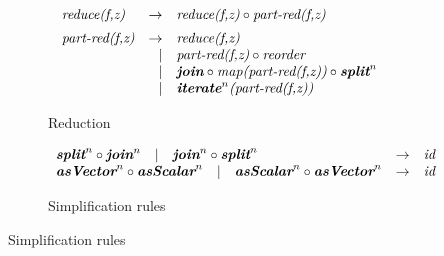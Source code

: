 \begin{figure}[t]
\vspace{\ruleSpace}
\begin{subfigure}[b]{1\linewidth}
\begin{mdframed}
$$
\begin{array}{lrl}
\pat{reduce(f,z)} & \rightarrow & \pat{reduce(f,z)} \circ \pat{part-red(f,z)}\\[.5em]
\pat{part-red(f,z)} & \rightarrow & \pat{reduce(f,z)}\\                                                      
  &| & \pat{part-red(f,z)} \circ \pat{reorder}\\    
  &| & \pat{\textbf{join}} \circ \pat{map(part-red(f,z))} \circ \pat{\textbf{split}}^n\\
  &| & \pat{\textbf{iterate}}^{n}\pat{(part-red(f,z))}\\
\end{array}
%
$$
\end{mdframed}
  \caption{Reduction}
  \label{fig:algo:red}
\end{subfigure}


\vspace{\ruleSpace}
\begin{subfigure}[b]{1\linewidth}
\begin{mdframed}
$$
\begin{array}{lrl}
\textit{\textbf{split}}^n \circ \textit{\textbf{join}}^n \hspace{1em} |\hspace{1em} \textit{\textbf{join}}^n \circ \textit{\textbf{split}}^n & \rightarrow & \textit{id}\\
\textit{\textbf{asVector}}^n \circ \textit{\textbf{asScalar}}^n \hspace{1em} |\hspace{1em} \textit{\textbf{asScalar}}^n \circ \textit{\textbf{asVector}}^n       & \rightarrow & \textit{id}\\
\end{array}
$$
\end{mdframed}
  \caption{Simplification rules}
   \label{fig:algo:simpl}
\end{subfigure}


\end{figure}
